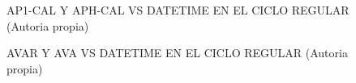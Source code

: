 \begin{figure}[H]
  \hfill
  \hfill
  \hfill
  \caption{AP1-CAL Y APH-CAL VS DATETIME EN EL CICLO REGULAR (Autoria propia)}
  \end{figure}
\begin{figure}[H]
  \hfill
  \hfill
  \hfill
  \caption{AVAR Y AVA VS DATETIME EN EL CICLO REGULAR (Autoria propia)}
  \end{figure}
